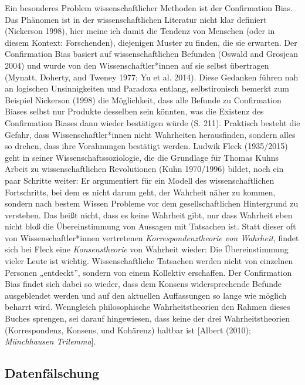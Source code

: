 \documentclass[
  letterpaper,
  DIV=11,
  numbers=noendperiod]{scrreprt}
\begin{document}
Ein besonderes Problem wissenschaftlicher Methoden ist der Confirmation
Bias. Das Phänomen ist in der wissenschaftlichen Literatur nicht klar
definiert (Nickerson 1998), hier meine ich damit die Tendenz von
Menschen (oder in diesem Kontext: Forschenden), diejenigen Muster zu
finden, die sie erwarten. Der Confirmation Bias basiert auf
wissenschaftlichen Befunden (Oswald and Grosjean 2004) und wurde von den
Wissenschaftler*innen auf sie selbst übertragen (Mynatt, Doherty, and
Tweney 1977; Yu et al. 2014). Diese Gedanken führen nah an logischen
Unsinnigkeiten und Paradoxa entlang, selbstironisch bemerkt zum Beispiel
Nickerson (1998) die Möglichkeit, dass alle Befunde zu Confirmation
Biases selbst nur Produkte desselben sein könnten, was die Existenz des
Confirmation Biases dann wieder bestätigen würde (S. 211). Praktisch
besteht die Gefahr, dass Wissenschaftler*innen nicht Wahrheiten
herausfinden, sondern alles so drehen, dass ihre Vorahnungen bestätigt
werden. Ludwik Fleck (1935/2015) geht in seiner Wissenschaftssoziologie,
die die Grundlage für Thomas Kuhns Arbeit zu wissenschaftlichen
Revolutionen (Kuhn 1970/1996) bildet, noch ein paar Schritte weiter: Er
argumentiert für ein Modell des wissenschaftlichen Fortschritts, bei dem
es nicht darum geht, der Wahrheit näher zu kommen, sondern nach bestem
Wissen Probleme vor dem gesellschaftlichen Hintergrund zu verstehen. Das
heißt nicht, dass es keine Wahrheit gibt, nur dass Wahrheit eben nicht
bloß die Übereinstimmung von Aussagen mit Tatsachen ist. Statt dieser
oft von Wissenschaftler*innen vertretenen \emph{Korrespondenztheorie von
Wahrheit}, findet sich bei Fleck eine \emph{Konsenstheorie} von Wahrheit
wieder: Die Übereinstimmung vieler Leute ist wichtig. Wissenschaftliche
Tatsachen werden nicht von einzelnen Personen „entdeckt'', sondern von
einem Kollektiv erschaffen. Der Confirmation Bias findet sich dabei so
wieder, dass dem Konsens widersprechende Befunde ausgeblendet werden und
auf den aktuellen Auffassungen so lange wie möglich beharrt wird.
Wenngleich philosophische Wahrheitstheorien den Rahmen dieses Buches
sprengen, sei darauf hingewiesen, dass keine der drei Wahrheitstheorien
(Korrespondenz, Konsens, und Kohärenz) haltbar ist {[}Albert (2010);
\emph{Münchhausen Trilemma}{]}.

\subsection{Datenfälschung}\label{datenfuxe4lschung}
\end{document}

